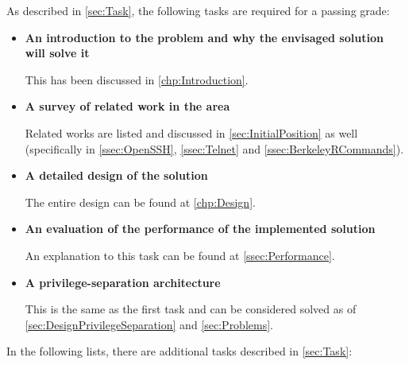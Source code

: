 \documentclass[10pt,a4paper,titlepage,twoside,english,final]{zhawreprt}
\begin{document}
As described in \ref{sec:Task}, the following tasks are required for a passing grade:

\begin{itemize}
\item \textbf{An introduction to the problem and why the envisaged solution will solve it}

This has been discussed in \ref{chp:Introduction}.

\item \textbf{A survey of related work in the area}

Related works are listed and discussed in \ref{sec:InitialPosition} as well (specifically in \ref{ssec:OpenSSH}, \ref{ssec:Telnet} and \ref{ssec:BerkeleyRCommands}).

\item \textbf{A detailed design of the solution}

The entire design can be found at \ref{chp:Design}.

\item \textbf{An evaluation of the performance of the implemented solution}

An explanation to this task can be found at \ref{ssec:Performance}.

\item \textbf{A privilege-separation architecture}

This is the same as the first task and can be considered solved as of \ref{sec:DesignPrivilegeSeparation} and \ref{sec:Problems}.
\end{itemize}

In the following lists, there are additional tasks described in \ref{sec:Task}:
\end{document}
